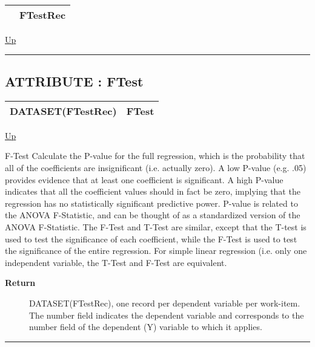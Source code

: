 {\renewcommand{\arraystretch}{1.5}
\begin{tabularx}{\textwidth}{|>{\raggedright\arraybackslash}l|X|}
\hline
\hspace{0pt} & FTestRec \\
\hline
\end{tabularx}
}

\hyperlink{ecldoc:linearregression.ols}{Up}

\par


\rule{\textwidth}{0.4pt}
\subsection*{ATTRIBUTE : FTest}
\hypertarget{ecldoc:linearregression.ols.ftest}{}

{\renewcommand{\arraystretch}{1.5}
\begin{tabularx}{\textwidth}{|>{\raggedright\arraybackslash}l|X|}
\hline
\hspace{0pt}DATASET(FTestRec) & FTest \\
\hline
\end{tabularx}
}

\hyperlink{ecldoc:linearregression.ols}{Up}

\par
F-Test Calculate the P-value for the full regression, which is the probability that all of the coefficients are insignificant (i.e. actually zero). A low P-value (e.g. .05) provides evidence that at least one coefficient is significant. A high P-value indicates that all the coefficient values should in fact be zero, implying that the regression has no statistically significant predictive power. P-value is related to the ANOVA F-Statistic, and can be thought of as a standardized version of the ANOVA F-Statistic. The F-Test and T-Test are similar, except that the T-test is used to test the significance of each coefficient, while the F-Test is used to test the significance of the entire regression. For simple linear regression (i.e. only one independent variable, the T-Test and F-Test are equivalent.

\par
\begin{description}
\item [\textbf{Return}] DATASET(FTestRec), one record per dependent variable per work-item. The number field indicates the dependent variable and corresponds to the number field of the dependent (Y) variable to which it applies.
\end{description}

\rule{\textwidth}{0.4pt}


